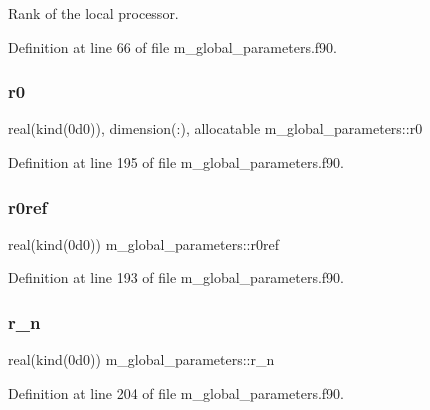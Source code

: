 Rank of the local processor. 



Definition at line 66 of file m\+\_\+global\+\_\+parameters.\+f90.

\mbox{\label{namespacem__global__parameters_a585a72037bbffe12e8d4512a57f52418}} 
\subsubsection{\texorpdfstring{r0}{r0}}
{\footnotesize\ttfamily real(kind(0d0)), dimension(\+:), allocatable m\+\_\+global\+\_\+parameters\+::r0}



Definition at line 195 of file m\+\_\+global\+\_\+parameters.\+f90.

\mbox{\label{namespacem__global__parameters_a24492f9b474683476a342e7ee42c1c6d}} 
\subsubsection{\texorpdfstring{r0ref}{r0ref}}
{\footnotesize\ttfamily real(kind(0d0)) m\+\_\+global\+\_\+parameters\+::r0ref}



Definition at line 193 of file m\+\_\+global\+\_\+parameters.\+f90.

\mbox{\label{namespacem__global__parameters_ae818e88601b1dc579a87e7c0c8cd87cb}} 
\subsubsection{\texorpdfstring{r\+\_\+n}{r\_n}}
{\footnotesize\ttfamily real(kind(0d0)) m\+\_\+global\+\_\+parameters\+::r\+\_\+n}



Definition at line 204 of file m\+\_\+global\+\_\+parameters.\+f90.

